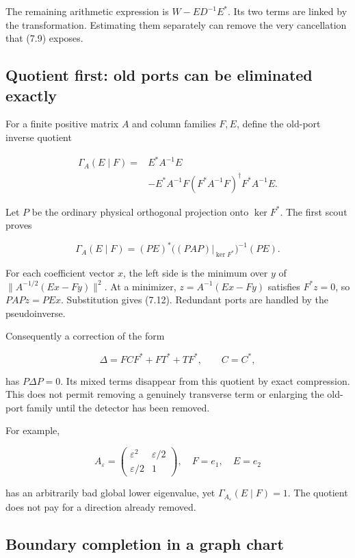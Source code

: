 \documentclass[
  10pt,
  a4paper,
  10pt,
  oneside,
  openany]{book}
\begin{document}
The remaining arithmetic expression is \(W-ED^{-1}E^*\). Its two terms
are linked by the transformation. Estimating them separately can remove
the very cancellation that (7.9) exposes.

\subsection{Quotient first: old ports can be eliminated
exactly}\label{quotient-first-old-ports-can-be-eliminated-exactly}

For a finite positive matrix \(A\) and column families \(F,E\), define
the old-port inverse quotient

\[
\begin{aligned}
\Gamma_A(E\mid F)={}&E^*A^{-1}E\\
&-E^*A^{-1}F(F^*A^{-1}F)^\dagger F^*A^{-1}E.
\end{aligned}
\tag{7.11}\label{eq:7.11}
\]

Let \(P\) be the ordinary physical orthogonal projection onto
\(\ker F^*\). The first scout proves

\[
\Gamma_A(E\mid F)
=(PE)^*\bigl((PAP)|_{\ker F^*}\bigr)^{-1}(PE).
\tag{7.12}\label{eq:7.12}
\]

For each coefficient vector \(x\), the left side is the minimum over
\(y\) of \(\|A^{-1/2}(Ex-Fy)\|^2\). At a minimizer, \(z=A^{-1}(Ex-Fy)\)
satisfies \(F^*z=0\), so \(PAPz=PEx\). Substitution gives (7.12).
Redundant ports are handled by the pseudoinverse.

Consequently a correction of the form

\[
\Delta=FCF^*+FT^*+TF^*,\qquad C=C^*,
\tag{7.13}\label{eq:7.13}
\]

has \(P\Delta P=0\). Its mixed terms disappear from this quotient by
exact compression. This does not permit removing a genuinely transverse
term or enlarging the old-port family until the detector has been
removed.

For example,

\[
A_\varepsilon=\begin{pmatrix}\varepsilon^2&\varepsilon/2\\
\varepsilon/2&1\end{pmatrix},\quad F=e_1,\quad E=e_2
\tag{7.14}\label{eq:7.14}
\]

has an arbitrarily bad global lower eigenvalue, yet
\(\Gamma_{A_\varepsilon}(E\mid F)=1\). The quotient does not pay for a
direction already removed.

\subsection{Boundary completion in a graph
chart}\label{boundary-completion-in-a-graph-chart}
\end{document}
